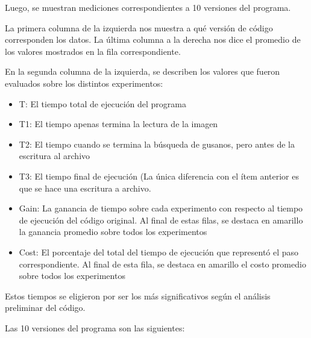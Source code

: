 \documentclass{article}
\begin{document}
Luego, se muestran mediciones correspondientes a 10 versiones del programa.

La primera columna de la izquierda nos muestra a qué versión de código corresponden los datos. La última columna a la derecha nos dice el promedio de los valores mostrados en la fila correspondiente.

En la segunda columna de la izquierda, se describen los valores que fueron evaluados sobre los distintos experimentos:
\begin{itemize}
\item T: El tiempo total de ejecución del programa
\item T1: El tiempo apenas termina la lectura de la imagen
\item T2: El tiempo cuando se termina la búsqueda de gusanos, pero antes de la escritura al archivo
\item T3: El tiempo final de ejecución (La única diferencia con el ítem anterior es que se hace una escritura a archivo.
\item Gain: La ganancia de tiempo sobre cada experimento con respecto al tiempo de ejecución del código original. Al final de estas filas, se destaca en amarillo la ganancia promedio sobre todos los experimentos
\item Cost: El porcentaje del total del tiempo de ejecución que representó el paso correspondiente. Al final de esta fila, se destaca en amarillo el costo promedio sobre todos los experimentos
\end{itemize}

Estos tiempos se eligieron por ser los más significativos según el análisis preliminar del código.

Las 10 versiones del programa son las siguientes:
\end{document}
